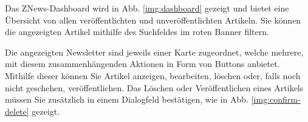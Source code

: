 Das ZNews-Dashboard wird in Abb. \ref{img:dashboard}
gezeigt und bietet eine Übersicht von allen veröffentlichten
und unveröffentlichten Artikeln.
Sie können die angezeigten Artikel mithilfe des Suchfeldes
im roten Banner filtern.


Die angezeigten Newsletter sind jeweils einer Karte zugeordnet,
welche mehrere, mit diesem zusammenhängenden Aktionen
in Form von Buttons anbietet.
Mithilfe dieser können Sie Artikel anzeigen,
bearbeiten, löschen oder,
falls noch nicht geschehen,
veröffentlichen.
Das Löschen oder Veröffentlichen eines Artikels
müssen Sie zusätzlich in einem Dialogfeld bestätigen,
wie in Abb. \ref{img:confirm-delete} gezeigt.

